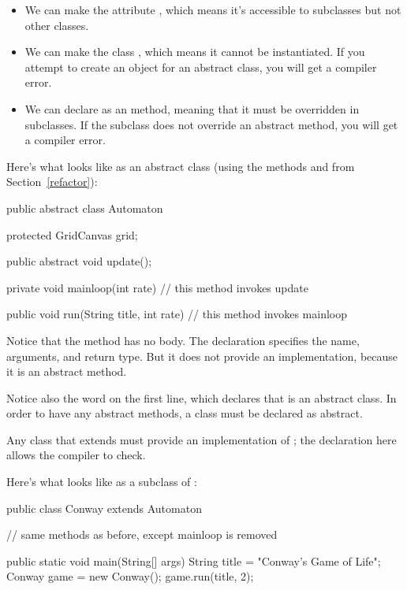 \begin{itemize}

\item We can make the  attribute , which means it's accessible to subclasses but not other classes.

\item We can make the class , which means it cannot be instantiated.
If you attempt to create an object for an abstract class, you will get a compiler error.

\item We can declare  as an  method, meaning that it must be overridden in subclasses.
If the subclass does not override an abstract method, you will get a compiler error.

\end{itemize}

Here's what  looks like as an abstract class (using the methods  and  from Section~\ref{refactor}):

\begin{code}
public abstract class Automaton {
    protected GridCanvas grid;

    public abstract void update();

    private void mainloop(int rate) {
        // this method invokes update
    }

    public void run(String title, int rate) {
        // this method invokes mainloop
    }
}
\end{code}

Notice that the  method has no body.
The declaration specifies the name, arguments, and return type.
But it does not provide an implementation, because it is an abstract method.

Notice also the word  on the first line, which declares that  is an abstract class.
In order to have any abstract methods, a class must be declared as abstract.

Any class that extends  must provide an implementation of ; the declaration here allows the compiler to check.

Here's what  looks like as a subclass of :

\begin{code}
public class Conway extends Automaton {

    // same methods as before, except mainloop is removed

    public static void main(String[] args) {
        String title = "Conway's Game of Life";
        Conway game = new Conway();
        game.run(title, 2);
    }
}
\end{code}

